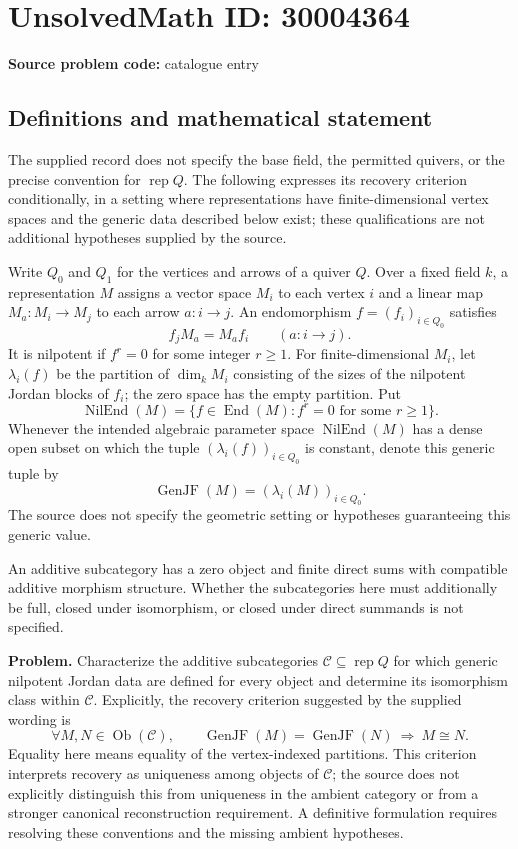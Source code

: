 \documentclass[11pt]{article}
\begin{document}
\section*{UnsolvedMath ID: 30004364}
\textbf{Source problem code:} catalogue entry
\subsection{Definitions and mathematical statement}
The supplied record does not specify the base field, the permitted quivers, or the precise convention for \(\operatorname{rep}Q\). The following expresses its recovery criterion conditionally, in a setting where representations have finite-dimensional vertex spaces and the generic data described below exist; these qualifications are not additional hypotheses supplied by the source.

Write \(Q_0\) and \(Q_1\) for the vertices and arrows of a quiver \(Q\). Over a fixed field \(k\), a representation \(M\) assigns a vector space \(M_i\) to each vertex \(i\) and a linear map \(M_a:M_i\to M_j\) to each arrow \(a:i\to j\). An endomorphism \(f=(f_i)_{i\in Q_0}\) satisfies
\[
 f_jM_a=M_af_i\qquad(a:i\to j).
\]
It is nilpotent if \(f^r=0\) for some integer \(r\geq1\). For finite-dimensional \(M_i\), let \(\lambda_i(f)\) be the partition of \(\dim_k M_i\) consisting of the sizes of the nilpotent Jordan blocks of \(f_i\); the zero space has the empty partition. Put
\[
 \operatorname{NilEnd}(M)=\{f\in\operatorname{End}(M):f^r=0\text{ for some }r\geq1\}.
\]
Whenever the intended algebraic parameter space \(\operatorname{NilEnd}(M)\) has a dense open subset on which the tuple \((\lambda_i(f))_{i\in Q_0}\) is constant, denote this generic tuple by
\[
 \operatorname{GenJF}(M)=(\lambda_i(M))_{i\in Q_0}.
\]
The source does not specify the geometric setting or hypotheses guaranteeing this generic value.

An additive subcategory has a zero object and finite direct sums with compatible additive morphism structure. Whether the subcategories here must additionally be full, closed under isomorphism, or closed under direct summands is not specified.

\textbf{Problem.} Characterize the additive subcategories \(\mathcal C\subseteq\operatorname{rep}Q\) for which generic nilpotent Jordan data are defined for every object and determine its isomorphism class within \(\mathcal C\). Explicitly, the recovery criterion suggested by the supplied wording is
\[
 \forall M,N\in\operatorname{Ob}(\mathcal C),\qquad
 \operatorname{GenJF}(M)=\operatorname{GenJF}(N)
 \ \Longrightarrow\ M\cong N.
\]
Equality here means equality of the vertex-indexed partitions. This criterion interprets recovery as uniqueness among objects of \(\mathcal C\); the source does not explicitly distinguish this from uniqueness in the ambient category or from a stronger canonical reconstruction requirement. A definitive formulation requires resolving these conventions and the missing ambient hypotheses.
\end{document}
